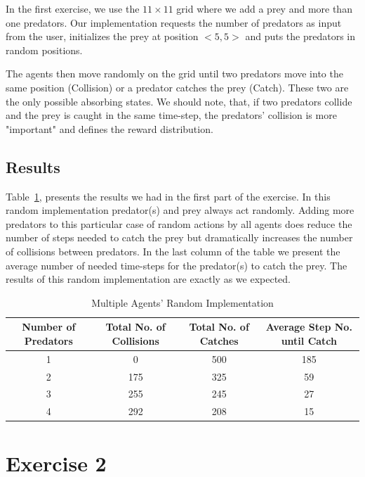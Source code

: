 \documentclass[a4paper,11pt]{article}
\begin{document}
In the first exercise, we use the $11 \times 11$ grid where we add a prey and more than one predators. Our implementation requests the number of predators as input from the user, initializes the prey at position $<5,5>$ and puts the predators in random positions. 

The agents then move randomly on the grid until two predators move into the same position (Collision) or a predator catches the prey (Catch). These two are the only possible absorbing states. We should note, that, if two predators collide and the prey is caught in the same time-step, the predators' collision is more "important" and defines the reward distribution.


\subsection{Results}
Table~\ref{table:multirandom}, presents the results we had in the first part of the exercise. In this random implementation predator(s) and prey always act randomly. Adding more predators to this particular case of random actions by all agents does reduce the number of steps needed to catch the prey but dramatically increases the number of collisions between predators. In the last column of the table we present the average number of needed time-steps for the predator(s) to catch the prey. The results of this random implementation are exactly as we expected.
\begin{table}[h]
\begin{center}
\caption{Multiple Agents' Random Implementation}
\begin{tabular}{c c c c} 
\hline\hline               
\textbf{\small{Number of Predators}} & \textbf{\small{Total No. of Collisions}} & \textbf{\small{Total No. of Catches}} & \textbf{\small{Average Step No. until Catch}} \\  
\hline
1 & 0 & 500 & 185\\ 
2 & 175 & 325  & 59\\
3 & 255 & 245   & 27\\
4 & 292 & 208 & 15 \\ 
\end{tabular}
\label{table:multirandom} 
\end{center} 
\end{table} 

\section{Exercise 2}
\end{document}
